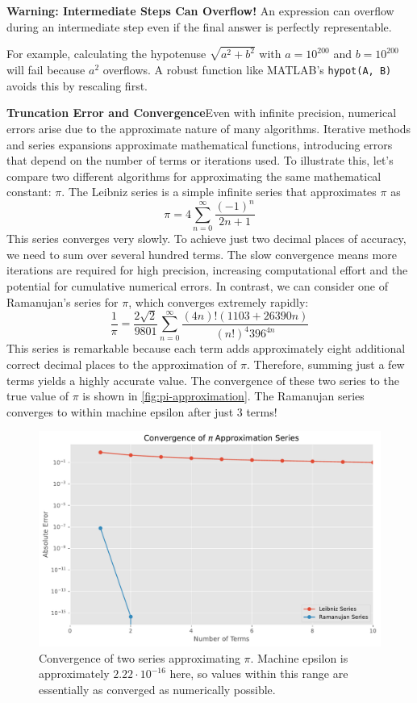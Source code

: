 \begin{warningBox}
    \textbf{Warning: Intermediate Steps Can Overflow!}
    An expression can overflow during an intermediate step even if the final answer is perfectly representable.

    For example, calculating the hypotenuse $\sqrt{a^2 + b^2}$ with $a=10^{200}$ and $b=10^{200}$ will fail because $a^2$ overflows. A robust function like MATLAB's \texttt{hypot(A, B)} avoids this by rescaling first.
\end{warningBox}

\textbf{Truncation Error and Convergence}\quad Even with infinite precision, numerical errors arise due to the approximate nature of many algorithms. Iterative methods and series expansions approximate mathematical functions, introducing errors that depend on the number of terms or iterations used. To illustrate this, let's compare two different algorithms for approximating the same mathematical constant: \(\pi\). The Leibniz series is a simple infinite series that approximates \(\pi\) as
\begin{equation*}
\pi = 4 \sum_{n=0}^\infty \frac{(-1)^n}{2n+1}
\end{equation*}
This series converges very slowly. To achieve just two decimal places of accuracy, we need to sum over several hundred terms. The slow convergence means more iterations are required for high precision, increasing computational effort and the potential for cumulative numerical errors. In contrast, we can consider one of Ramanujan's series for \(\pi\), which converges extremely rapidly:
\begin{equation*}
    \frac{1}{\pi} = \frac{2\sqrt{2}}{9801} \sum_{n=0}^\infty \frac{(4n)! (1103 + 26390n)}{(n!)^4 396^{4n}}
\end{equation*}
This series is remarkable because each term adds approximately eight additional correct decimal places to the approximation of \(\pi\). Therefore, summing just a few terms yields a highly accurate value. The convergence of these two series to the true value of $\pi$ is shown in \autoref{fig:pi-approximation}. The Ramanujan series converges to within machine epsilon after just 3 terms!

\begin{figure}[!h]
    \centering
    \includegraphics[width=.65\textwidth]{figs/computation/pi-convergence.pdf}
    \caption{Convergence of two series approximating \(\pi\). Machine epsilon is approximately \(2.22 \cdot 10^{-16}\) here, so values within this range are essentially as converged as numerically possible.}
    \label{fig:pi-approximation}
\end{figure}

